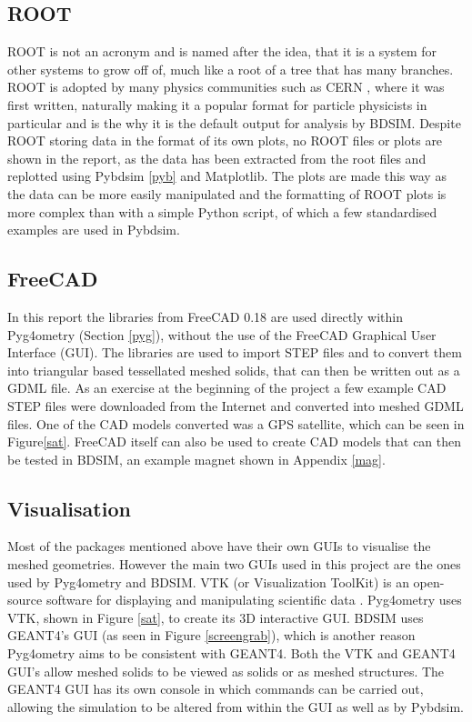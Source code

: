 \documentclass[12pt,a4paper]{article}
\begin{document}
\subsection{ROOT}\label{root}
ROOT is not an acronym and is named after the idea, that it is a system for other systems to grow off of, much like a root of a tree that has many branches. ROOT is adopted by many physics communities such as CERN \cite{cern}, where it was first written, naturally making it a popular format for particle physicists in particular and is the why it is the default output for analysis by BDSIM. Despite ROOT storing data in the format of its own plots, no ROOT files or plots are shown in the report, as the data has been extracted from the root files and replotted using Pybdsim \ref{pyb} and Matplotlib. The plots are made this way as the data can be more easily manipulated and the formatting of ROOT plots is more complex than with a simple Python script, of which a few standardised examples are used in Pybdsim.

\subsection{FreeCAD}
In this report the libraries from FreeCAD 0.18 \cite{18} are used directly within Pyg4ometry (Section \ref{pyg}), without the use of the FreeCAD Graphical User Interface (GUI). The libraries are used to import STEP files and to convert them into triangular based tessellated meshed solids, that can then be written out as a GDML file. As an exercise at the beginning of the project a few example CAD STEP files were downloaded from the Internet and converted into meshed GDML files. One of the CAD models converted was a GPS satellite, which can be seen in Figure\ref{sat}. FreeCAD itself can also be used to create CAD models that can then be tested in BDSIM, an example magnet shown in Appendix \ref{mag}.

\subsection{Visualisation}
\label{vis}
Most of the packages mentioned above have their own GUIs to visualise the meshed geometries. However the main two GUIs used in this project are the ones used by Pyg4ometry and BDSIM. VTK (or Visualization ToolKit) is an open-source software for displaying and manipulating scientific data \cite{vtk}. Pyg4ometry uses VTK, shown in Figure \ref{sat}, to create its 3D interactive GUI. BDSIM uses GEANT4's GUI (as seen in Figure \ref{screengrab}), which is another reason Pyg4ometry aims to be consistent with GEANT4. Both the VTK and GEANT4 GUI's allow meshed solids to be viewed as solids or as meshed structures. The GEANT4 GUI has its own console in which commands can be carried out, allowing the simulation to be altered from within the GUI as well as by Pybdsim.
\end{document}
